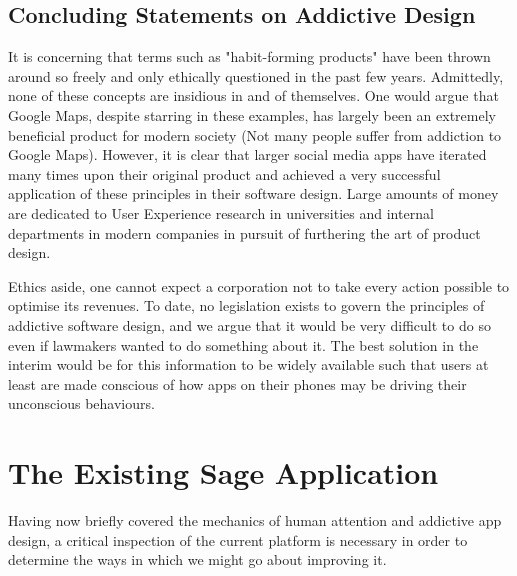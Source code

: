 \subsection{Concluding Statements on Addictive Design}
It is concerning that terms such as "habit-forming products" have been thrown around so freely and only ethically questioned in the past few years. Admittedly, none of these concepts are insidious in and of themselves. One would argue that Google Maps, despite starring in these examples, has largely been an extremely beneficial product for modern society (Not many people suffer from addiction to Google Maps). However, it is clear that larger social media apps have iterated many times upon their original product and achieved a very successful application of these principles in their software design. Large amounts of money are dedicated to User Experience research in universities and internal departments in modern companies in pursuit of furthering the art of product design.

Ethics aside, one cannot expect a corporation not to take every action possible to optimise its revenues. To date, no legislation exists to govern the principles of addictive software design, and we argue that it would be very difficult to do so even if lawmakers wanted to do something about it. The best solution in the interim would be for this information to be widely available such that users at least are made conscious of how apps on their phones may be driving their unconscious behaviours.

\section{The Existing Sage Application}
Having now briefly covered the mechanics of human attention and addictive app design, a critical inspection of the current platform is necessary in order to determine the ways in which we might go about improving it.

